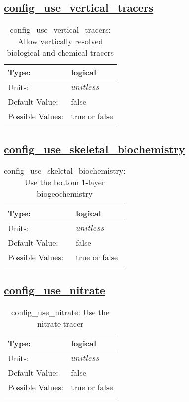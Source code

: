 \subsection[config\_use\_vertical\_tracers]{\hyperref[sec:nm_tab_biogeochemistry]{config\_use\_vertical\_tracers}}
\label{subsec:nm_sec_config_use_vertical_tracers}
\begin{center}
\begin{longtable}{| p{2.0in} || p{4.0in} |}
    \hline
    Type: & logical \\
    \hline
    Units: & $unitless$ \\
    \hline
    Default Value: & false \\
    \hline
    Possible Values: & true or false \\
    \hline
    \caption{config\_use\_vertical\_tracers: Allow vertically resolved biological and chemical tracers}
\end{longtable}
\end{center}
\subsection[config\_use\_skeletal\_biochemistry]{\hyperref[sec:nm_tab_biogeochemistry]{config\_use\_skeletal\_biochemistry}}
\label{subsec:nm_sec_config_use_skeletal_biochemistry}
\begin{center}
\begin{longtable}{| p{2.0in} || p{4.0in} |}
    \hline
    Type: & logical \\
    \hline
    Units: & $unitless$ \\
    \hline
    Default Value: & false \\
    \hline
    Possible Values: & true or false \\
    \hline
    \caption{config\_use\_skeletal\_biochemistry: Use the bottom 1-layer biogeochemistry}
\end{longtable}
\end{center}
\subsection[config\_use\_nitrate]{\hyperref[sec:nm_tab_biogeochemistry]{config\_use\_nitrate}}
\label{subsec:nm_sec_config_use_nitrate}
\begin{center}
\begin{longtable}{| p{2.0in} || p{4.0in} |}
    \hline
    Type: & logical \\
    \hline
    Units: & $unitless$ \\
    \hline
    Default Value: & false \\
    \hline
    Possible Values: & true or false \\
    \hline
    \caption{config\_use\_nitrate: Use the nitrate tracer}
\end{longtable}
\end{center}

